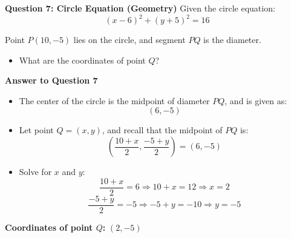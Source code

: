 \documentclass{beamer}
\begin{document}
\begin{frame}{\textbf{Question 7: Circle Equation (Geometry)}}
Given the circle equation:
\[
(x - 6)^2 + (y + 5)^2 = 16
\]

Point \( P(10, -5) \) lies on the circle, and segment \( PQ \) is the diameter.

\begin{itemize}
    \item What are the coordinates of point \( Q \)?
\end{itemize}
\end{frame}

\begin{frame}{\textbf{Answer to Question 7}}
\begin{itemize}
    \item The center of the circle is the midpoint of diameter \( PQ \), and is given as:
    \[
    (6, -5)
    \]
    
    \item Let point \( Q = (x, y) \), and recall that the midpoint of \( PQ \) is:
    \[
    \left( \frac{10 + x}{2}, \frac{-5 + y}{2} \right) = (6, -5)
    \]
    
    \item Solve for \( x \) and \( y \):
    \[
    \frac{10 + x}{2} = 6 \Rightarrow 10 + x = 12 \Rightarrow x = 2
    \]
    \[
    \frac{-5 + y}{2} = -5 \Rightarrow -5 + y = -10 \Rightarrow y = -5
    \]
\end{itemize}

\textbf{Coordinates of point \( Q \):} \( \boxed{(2, -5)} \)
\end{frame}
\end{document}
